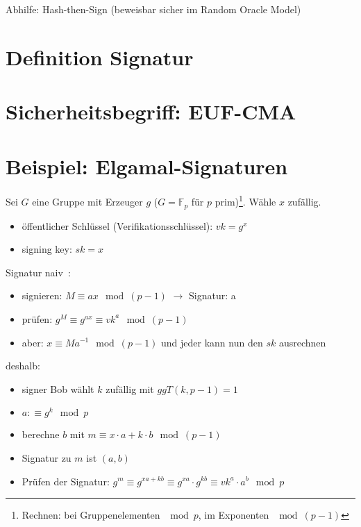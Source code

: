 \documentclass[a4paper,twoside,DIV15,BCOR12mm]{scrbook}
\begin{document}
Abhilfe: Hash-then-Sign (beweisbar sicher im Random Oracle Model)

\section{Definition Signatur}


\section{Sicherheitsbegriff: EUF-CMA}

\section{Beispiel: Elgamal-Signaturen}

Sei $G$ eine Gruppe mit Erzeuger $g$ ($G = \mathbb{F}_p$ für $p$ prim)\footnote{Rechnen: bei Gruppenelementen $\mod{p}$, im Exponenten $\mod{(p-1)}$}. Wähle $x$ zufällig.

\begin{itemize}
	\item öffentlicher Schlüssel (Verifikationsschlüssel): $vk = g^x$
	\item signing key: $sk = x$
\end{itemize}

Signatur \glqq naiv\grqq\ :

\begin{itemize}
	\item signieren: $M \equiv ax \mod{(p-1)}$ $\rightarrow$ Signatur: a
	\item prüfen: $g^M \equiv g^{ax} \equiv {vk}^a \mod{(p-1)}$
	\item aber: $x \equiv Ma^{-1} \mod{(p-1)}$ und jeder kann nun den $sk$ ausrechnen
\end{itemize}

deshalb:

\begin{itemize}
	\item signer Bob wählt $k$ zufällig mit $ggT(k, p-1) = 1$
	\item $ a :\equiv g^k \mod{p}$
	\item berechne $b$ mit $m \equiv x \cdot a + k \cdot b \mod{(p-1)}$
	\item Signatur zu $m$ ist $(a,b)$
	\item Prüfen der Signatur: $g^m \equiv g^{xa+kb} \equiv g^{xa} \cdot g^{kb} \equiv {vk}^a \cdot a^b \mod{p}$
\end{itemize}
\end{document}

